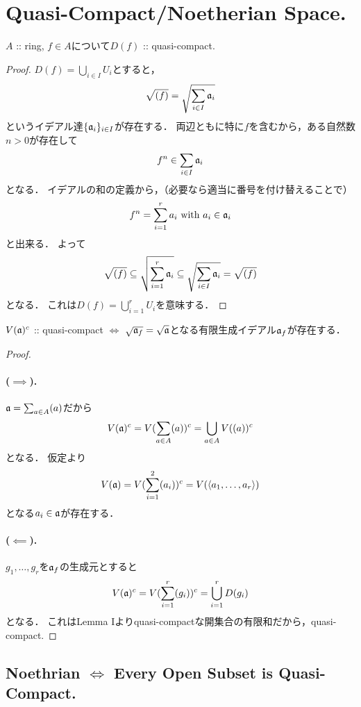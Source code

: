 \documentclass[a4paper]{jsarticle}
\begin{document}
\section{Quasi-Compact/Noetherian Space.} %
    \begin{Lemma}[I]
        $A$ :: ring, $f \in A$について$D(f)$ :: quasi-compact.
    \end{Lemma}
    \begin{proof}
        $D(f)=\bigcup_{i \in I} U_i$とすると，
        \[ \sqrt{(f)}=\sqrt{\sum_{i \in I} \mathfrak{a}_i} \]
        というイデアル達$\{\mathfrak{a}_i\}_{i \in I}$が存在する．
        両辺ともに特に$f$を含むから，ある自然数$n>0$が存在して
        \[ f^n \in \sum_{i \in I} \mathfrak{a}_i \]
        となる．
        イデアルの和の定義から，（必要なら適当に番号を付け替えることで）
        \[ f^n=\sum_{i=1}^{r} a_i \text{ with } a_i \in \mathfrak{a}_i \]
        と出来る．
        よって
        \[
            \sqrt{(f)}
            \subseteq \sqrt{\sum_{i=1}^{r} \mathfrak{a}_i}
            \subseteq \sqrt{\sum_{i \in I} \mathfrak{a}_i}=\sqrt{(f)}
        \]
        となる．
        これは$D(f)=\bigcup_{i=1}^r U_i$を意味する．
    \end{proof}
    \begin{Lemma}[II]
        $V(\mathfrak{a})^c$ :: quasi-compact
        $\iff$
        $\sqrt{\mathfrak{a}_f}=\sqrt{\mathfrak{a}}$となる有限生成イデアル$\mathfrak{a}_f$が存在する．
    \end{Lemma}
    \begin{proof}
        \paragraph{($\implies$).}
        $\mathfrak{a}=\sum_{a \in A} (a)$だから
        \[ V(\mathfrak{a})^c=V(\sum_{a \in A} (a))^c=\bigcup_{a \in A} V((a))^c \]となる．
        仮定より
        \[ V(\mathfrak{a})=V(\sum_{i=1}^2 (a_i))^c=V(\langle a_1,\dots,a_r\rangle) \]
        となる$a_i \in \mathfrak{a}$が存在する．

        \paragraph{($\impliedby$).}
        $g_1,\dots,g_r$を$\mathfrak{a}_f$の生成元とすると
        \[ V(\mathfrak{a})^c=V(\sum_{i=1}^r (g_i))^c=\bigcup_{i=1}^r D(g_i) \]となる．
        これはLemma Iよりquasi-compactな開集合の有限和だから，quasi-compact.
    \end{proof}

    \subsection{Noethrian $\iff$ Every Open Subset is Quasi-Compact.}
\end{document}
